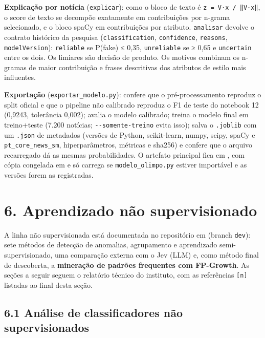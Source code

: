 \documentclass[
  brazilian,
  11pt,
]{article}
\begin{document}
\textbf{Explicação por notícia} (\texttt{explicar}): como o bloco de texto é \texttt{z\ =\ V·x\ /\ ‖V·x‖}, o score de texto se decompõe exatamente em contribuições por n-grama selecionado, e o bloco spaCy em contribuições por atributo. \texttt{analisar} devolve o contrato histórico da pesquisa (\texttt{classification}, \texttt{confidence}, \texttt{reasons}, \texttt{modelVersion}): \texttt{reliable} se P(fake) ≤ 0,35, \texttt{unreliable} se ≥ 0,65 e \texttt{uncertain} entre os dois. Os limiares são decisão de produto. Os motivos combinam os n-gramas de maior contribuição e frases descritivas dos atributos de estilo mais influentes.

\textbf{Exportação} (\texttt{exportar\_modelo.py}): confere que o pré-processamento reproduz o split oficial e que o pipeline não calibrado reproduz o F1 de teste do notebook 12 (0,9243, tolerância 0,002); avalia o modelo calibrado; treina o modelo final em treino+teste (7.200 notícias; \texttt{-\/-somente-treino} evita isso); salva o \texttt{.joblib} com um \texttt{.json} de metadados (versões de Python, scikit-learn, numpy, scipy, spaCy e \texttt{pt\_core\_news\_sm}, hiperparâmetros, métricas e sha256) e confere que o arquivo recarregado dá as mesmas probabilidades. O artefato principal fica em , com cópia congelada em  e só carrega se \texttt{modelo\_olimpo.py} estiver importável e as versões forem as registradas.

\section{6. Aprendizado não supervisionado}\label{aprendizado-nuxe3o-supervisionado}

A linha não supervisionada está documentada no repositório em  (branch \texttt{dev}): sete métodos de detecção de anomalias, agrupamento e aprendizado semi-supervisionado, uma comparação externa com o Jev (LLM) e, como método final de descoberta, a \textbf{mineração de padrões frequentes com FP-Growth}. As seções a seguir seguem o relatório técnico do instituto, com as referências \texttt{{[}n{]}} listadas ao final desta seção.

\subsection{6.1 Análise de classificadores não supervisionados}\label{anuxe1lise-de-classificadores-nuxe3o-supervisionados}
\end{document}

